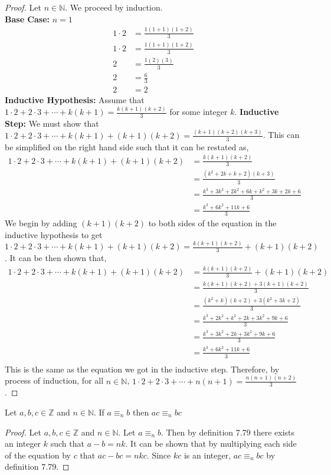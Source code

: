 \documentclass[12pt]{article}
\newenvironment{theorem}[2][Theorem]{\begin{trivlist}
\item[\hskip \labelsep {\bfseries #1}\hskip \labelsep {\bfseries #2.}]}{\end{trivlist}}
\begin{document}
	\begin{proof}
		Let $n \in \mathbb{N}$. We proceed by induction.\\
		\textbf{Base Case:} $n = 1$\\
		\begin{align*}
			1\cdot2 &= \frac{1(1+1)(1+2)}{3}\\
			1\cdot2 &= \frac{1(1+1)(1+2)}{3}\\
			2 &= \frac{1(2)(3)}{3}\\
			2 &= \frac{6}{3}\\
			2 &= 2
		\end{align*}
		\textbf{Inductive Hypothesis:} Assume that $1\cdot2 + 2\cdot3 + \cdots + k(k+1) = \frac{k(k+1)(k+2)}{3}$ for
		some integer $k$. 
		\textbf{Inductive Step:} We must show that $1\cdot2 + 2\cdot3 + \cdots + k(k+1) + (k+1)(k+2) = \frac{(k+1)(k+2)(k+3)}{3}$.
		This can be simplified on the right hand side such that it can be restated as,
		\begin{align*}
		    1\cdot2 + 2\cdot3 + \cdots + k(k+1) + (k+1)(k+2) &= \frac{k(k+1)(k+2)}{3}\\
							&= \frac{(k^2+2k+k+2)(k+3)}{3}\\
							&= \frac{k^3+3k^2+2k^2+6k+k^2+3k+2k+6}{3}\\
							&= \frac{k^3+6k^2+11k+6}{3}
		\end{align*}
		We begin by adding $(k+1)(k+2)$ to both sides of the equation in the inductive hypothesis to get
		$1\cdot2 + 2\cdot3 + \cdots + k(k+1) + (k+1)(k+2) = \frac{k(k+1)(k+2)}{3} + (k+1)(k+2)$.
		It can be then shown that,
		\begin{align*}
		    1\cdot2 + 2\cdot3 + \cdots + k(k+1) + (k+1)(k+2) &= \frac{k(k+1)(k+2)}{3} + (k+1)(k+2)\\
								     &= \frac{k(k+1)(k+2)+3(k+1)(k+2)}{3}\\
								     &= \frac{(k^2+k)(k+2)+3(k^2+3k+2)}{3}\\
								     &= \frac{k^3+2k^2+k^2+2k+3k^2+9k+6}{3}\\
								     &= \frac{k^3+3k^2+2k+3k^2+9k+6}{3}\\
								     &= \frac{k^3+6k^2+11k+6}{3}\\
		\end{align*}
		This is the same as the equation we got in the inductive step.
		Therefore, by process of induction, for all $n \in \mathbb{N}$, $1\cdot2 + 2\cdot3 + \cdots + n(n+1) = \frac{n(n+1)(n+2)}{3}$.
	\end{proof}
\begin{theorem}{4}
	Let $a,b,c \in \mathbb{Z}$ and $n\in \mathbb{N}$. If $a\equiv_nb$ then 
	$ac\equiv_nbc$
\end{theorem}
	\begin{proof}
		Let $a,b,c \in \mathbb{Z}$ and $n\in \mathbb{N}$. Let 
		$a\equiv_nb$. Then by definition 7.79 there exists an integer $k$ such that $a-b=nk$.
		It can be shown that by multiplying each side of the equation by $c$ that $ac-bc=nkc$.
		Since $kc$ is an integer, $ac\equiv_nbc$ by definition 7.79.
\end{proof}
\end{document}
